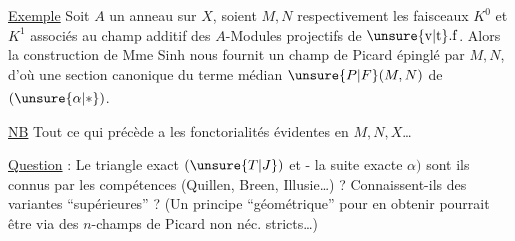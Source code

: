 
\uline{Exemple} Soit $A$ un anneau sur $X$, soient $M,N$ respectivement les faisceaux $K^{0}$ et $K^{1}$ associés au champ additif des $A$-Modules projectifs de $\unsure{\mathrm{v}|\mathrm{t}}.\mathrm{f}$.  Alors la construction de Mme Sinh nous fournit un champ de Picard épinglé par $M,N$, d'où une section  canonique du terme médian $\unsure{P|F}(M,N)$ de $(\unsure{\alpha|*})$.\textsuperscript{}

\uline{NB} Tout ce qui précède a les fonctorialités évidentes en $M,N,X$\ldots

\uline{Question} : Le triangle exact $(\unsure{T|J})$ et - la suite exacte $\alpha)$ sont ils connus par les compétences (Quillen, Breen, Illusie\ldots) ? Connaissent-ils des variantes ``supérieures'' ? (Un principe ``géométrique'' pour en obtenir pourrait être via des $n$-champs de Picard non néc. stricts\ldots)
